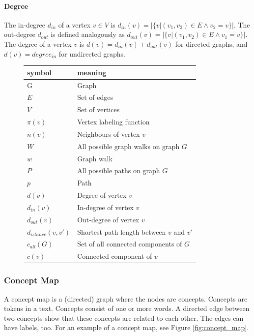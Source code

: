 \paragraph{Degree}
The in-degree $d_{in}$ of a vertex $v \in V$ is $d_{in}(v) = |\{v | (v_1, v_2) \in E \land v_2 = v\}|$.
The out-degree $d_{out}$ is defined analogously as $d_{out}(v) = |\{v | (v_1, v_2) \in E \land v_1 = v\}|$.
The degree of a vertex $v$ is $d(v) = d_{in}(v) + d_{out}(v)$ for directed graphs, and $d(v) = degree_{in}$ for undirected graphs.

\begin{figure}[ht]
\centering
\begin{tabular}{ll}
symbol &  meaning \\
\midrule
G & Graph \\
$E$ & Set of edges \\
$V$ & Set of vertices \\
$\pi(v)$ & Vertex labeling function \\
$n(v)$ & Neighbours of vertex $v$ \\
$W$ & All possible graph walks on graph $G$ \\
$w$ & Graph walk \\
$P$ & All possible paths on graph $G$ \\
$p$ & Path \\
$d(v)$ & Degree of vertex $v$ \\
$d_{in}(v)$ & In-degree of vertex $v$ \\
$d_{out}(v)$ & Out-degree of vertex $v$ \\
$d_{istance}(v, v')$ & Shortest path length between $v$ and $v'$ \\
$c_{all}(G)$ & Set of all connected components of $G$ \\
$c(v)$ & Connected component of $v$ \\
\end{tabular}
\end{figure}

\subsubsection{Concept Map}
A concept map is a (directed) graph where the nodes are concepts.
Concepts are tokens in a text.
Concepts consist of one or more words.
A directed edge between two concepts show that these concepts are related to each other. The edges can have labels, too.
For an example of a concept map, see Figure \ref{fig:concept_map}.

